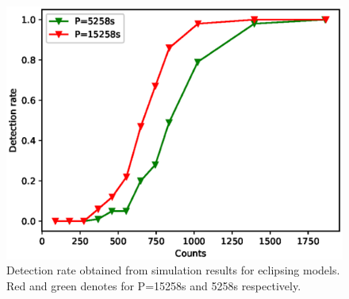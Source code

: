 \documentclass[twoside,twocolumn]{aastex63}
\begin{document}
\begin{figure}[ht!]
\centering
\includegraphics[scale=0.61]{./figure/sim_LW/eclipse.eps}
\caption{Detection rate obtained from simulation results for eclipsing models. Red and green denotes for P=15258s and 5258s respectively. \label{fig:eclipse}}
\end{figure}


\end{document}
